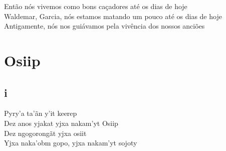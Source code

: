 \bigskip

\begin{linenumbers}\begingroup\raggedright
 
\noindent   Então nós vivemos como bons caçadores até os dias de hoje\\
  Waldemar, Garcia, nós estamos matando um pouco até os dias de hoje\\
  Antigamente, nós nos guiávamos pela vivência dos nossos anciões
\end{linenumbers}\endgroup

\chapter*{Osiip}


\medskip
\section{i}

\begin{linenumbers}\begingroup\raggedright
  \noindent Pyry'a ta'ãn y'it keerep\\
  Dez anos yjakat yjxa nakam'yt Osiip\\
  Dez ngogorongãt yjxa osiit\\
  Yjxa naka'obm gopo, yjxa nakam'yt sojoty
 
\end{linenumbers}\endgroup

\bigskip

